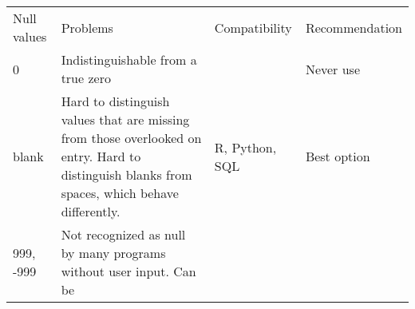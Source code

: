 \begin{longtable}[c]{@{}llll@{}}
\toprule\addlinespace
\begin{minipage}[b]{0.10\columnwidth}\raggedright
Null values
\end{minipage} & \begin{minipage}[b]{0.23\columnwidth}\raggedright
Problems
\end{minipage} & \begin{minipage}[b]{0.17\columnwidth}\raggedright
Compatibility
\end{minipage} & \begin{minipage}[b]{0.18\columnwidth}\raggedright
Recommendation
\end{minipage}
\\\addlinespace
\midrule\endhead
\begin{minipage}[t]{0.10\columnwidth}\raggedright
0
\end{minipage} & \begin{minipage}[t]{0.23\columnwidth}\raggedright
Indistinguishable from a true zero
\end{minipage} & \begin{minipage}[t]{0.17\columnwidth}\raggedright
\end{minipage} & \begin{minipage}[t]{0.18\columnwidth}\raggedright
Never use
\end{minipage}
\\\addlinespace
\begin{minipage}[t]{0.10\columnwidth}\raggedright
blank
\end{minipage} & \begin{minipage}[t]{0.23\columnwidth}\raggedright
Hard to distinguish values that are missing from those overlooked on
entry. Hard to distinguish blanks from spaces, which behave differently.
\end{minipage} & \begin{minipage}[t]{0.17\columnwidth}\raggedright
R, Python, SQL
\end{minipage} & \begin{minipage}[t]{0.18\columnwidth}\raggedright
Best option
\end{minipage}
\\\addlinespace
\begin{minipage}[t]{0.10\columnwidth}\raggedright
999, -999
\end{minipage} & \begin{minipage}[t]{0.23\columnwidth}\raggedright
Not recognized as null by many programs without user input. Can be

\end{minipage}
\end{longtable}
